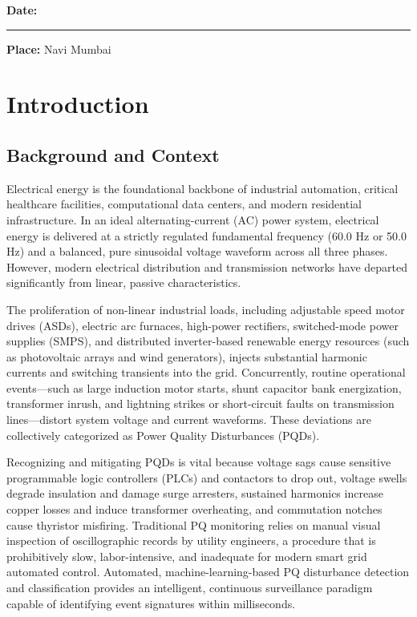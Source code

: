 \documentclass[12pt,a4paper]{report}
\begin{document}
\vfill
\noindent
\textbf{Date:} \rule{3.5cm}{0.4pt} \hfill \textbf{Place:} Navi Mumbai
\clearpage
\tableofcontents
\clearpage
\listoffigures
\clearpage
\listoftables
\clearpage

\chapter{Introduction}

\section{Background and Context}
Electrical energy is the foundational backbone of industrial automation, critical healthcare facilities, computational data centers, and modern residential infrastructure. In an ideal alternating-current (AC) power system, electrical energy is delivered at a strictly regulated fundamental frequency (60.0 Hz or 50.0 Hz) and a balanced, pure sinusoidal voltage waveform across all three phases. However, modern electrical distribution and transmission networks have departed significantly from linear, passive characteristics.

The proliferation of non-linear industrial loads, including adjustable speed motor drives (ASDs), electric arc furnaces, high-power rectifiers, switched-mode power supplies (SMPS), and distributed inverter-based renewable energy resources (such as photovoltaic arrays and wind generators), injects substantial harmonic currents and switching transients into the grid. Concurrently, routine operational events---such as large induction motor starts, shunt capacitor bank energization, transformer inrush, and lightning strikes or short-circuit faults on transmission lines---distort system voltage and current waveforms. These deviations are collectively categorized as Power Quality Disturbances (PQDs).

Recognizing and mitigating PQDs is vital because voltage sags cause sensitive programmable logic controllers (PLCs) and contactors to drop out, voltage swells degrade insulation and damage surge arresters, sustained harmonics increase copper losses and induce transformer overheating, and commutation notches cause thyristor misfiring. Traditional PQ monitoring relies on manual visual inspection of oscillographic records by utility engineers, a procedure that is prohibitively slow, labor-intensive, and inadequate for modern smart grid automated control. Automated, machine-learning-based PQ disturbance detection and classification provides an intelligent, continuous surveillance paradigm capable of identifying event signatures within milliseconds.
\end{document}
